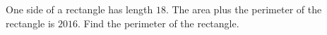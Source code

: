One side of a rectangle has length $18$. The area plus the perimeter of the rectangle is $2016$. Find the perimeter of the rectangle.

